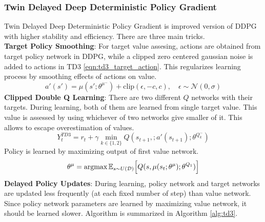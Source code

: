 \subsubsection{Twin Delayed Deep Deterministic Policy Gradient}
Twin Delayed Deep Deterministic Policy Gradient \cite{fujimoto_addressing_2018} is improved version of DDPG with higher stability and efficiency. There are three main tricks. \\
\textbf{Target Policy Smoothing}: For target value assesing, actions are obtained from target policy network in DDPG, while a clipped zero centered gaussian noise is added to actions in TD3 \ref{eqn:td3_target_action}. This regularizes learning process by smoothing effects of actions on value. \\
\begin{equation}
\label{eqn:td3_target_action}
a'(s') = \mu(s';\theta^{\mu^-}) + \text{clip}(\epsilon, -c, c), \quad \epsilon \sim \mathcal{N}(0, \sigma)
\end{equation}
\textbf{Clipped Double Q Learning}: There are two different $Q$ networks with their targets. During learning, both of them are learned from single target value. This value is assessed by using whichever of two networks give smaller of it. This allows to escape overestimation of values. \\
\begin{equation}
\label{eqn:td3_target}
Y_t^{TD3} = r_t + \gamma \min_{k\in\{1,2\}} Q(s_{t+1}, ;a'(s_{t+1});\theta^{Q_k^-})
\end{equation}
Policy is learned by maximizing output of first value network. \\
\begin{equation}
\label{eqn:td3_value_maximization}
\theta^\mu = \operatorname{\textup{argmax}} \mathbb{E}_{s \sim U(\mathcal{D})} \Big[ Q(s, \mu(s_t;\theta^\mu);\theta^{Q_1}) \Big]
\end{equation}
\textbf{Delayed Policy Updates}: During learning, policy network and target networks are updated less frequently (at each fixed number of step) than value network. Since policy network parameters are learned by maximizing value network, it should be learned slower. Algorithm is summarized in Algorithm \ref{alg:td3}. \\
